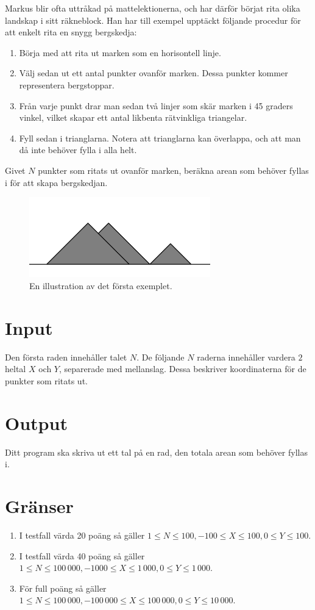 Markus blir ofta uttråkad på mattelektionerna, och har därför börjat rita olika landskap i sitt räkneblock. Han har till exempel upptäckt följande procedur för att enkelt rita en snygg bergskedja:

\begin{enumerate}
\item Börja med att rita ut marken som en horisontell linje.
\item Välj sedan ut ett antal punkter ovanför marken. Dessa punkter kommer representera bergstoppar.
\item Från varje punkt drar man sedan två linjer som skär marken i 45 graders vinkel, vilket skapar ett antal likbenta rätvinkliga triangelar.
\item Fyll sedan i trianglarna. Notera att trianglarna kan överlappa, och att man då inte behöver fylla i alla helt.
\end{enumerate}

\noindent Givet $N$ punkter som ritats ut ovanför marken, beräkna arean som behöver fyllas i för att skapa bergskedjan.

\begin{figure}[ht!]
\centering
\includegraphics[width=0.7\textwidth]{bergskedja.png}
\caption{En illustration av det första exemplet.}
\label{overflow}
\end{figure}

\section*{Input}
Den första raden innehåller talet $N$. De följande $N$ raderna innehåller vardera $2$ heltal $X$ och $Y$, separerade med mellanslag. Dessa beskriver koordinaterna för de punkter som ritats ut.

\section*{Output}
Ditt program ska skriva ut ett tal på en rad, den totala arean som behöver fyllas i.

\section*{Gränser}
\begin{enumerate}
\item I testfall värda 20 poäng så gäller $1 \le N\le 100, -100 \le X \le 100, 0 \le Y \le 100$.
\item I testfall värda 40 poäng så gäller $1 \le N\le 100\,000, -1 000 \le X \le 1\,000, 0 \le Y \le 1\,000$.
\item För full poäng så gäller $1 \le N\le 100\,000, -100\,000 \le X \le 100\,000, 0 \le Y \le 10\,000$.
\end{enumerate}

